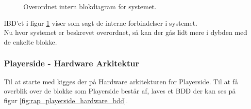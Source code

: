 \documentclass[Rapport/Rapport_main.tex]{subfiles}
\begin{document}
\begin{figure}[H]
    \centering
    \caption{Overordnet intern blokdiagram for systemet.}
    \label{fig:rap_overall_hardware_ibd}
\end{figure}
IBD'et i figur \ref{fig:rap_overall_hardware_ibd} viser som sagt de interne forbindelser i systemet. \\
Nu hvor systemet er beskrevet overordnet, så kan der gås lidt mere i dybden med de enkelte blokke.
\subsubsection{Playerside - Hardware Arkitektur}
Til at starte med kigges der på Hardware arkitekturen for Playerside. Til at få overblik over de blokke som Playerside består af, laves et BDD der kan ses på figur \ref{fig:rap_playerside_hardware_bdd}.
\end{document}
